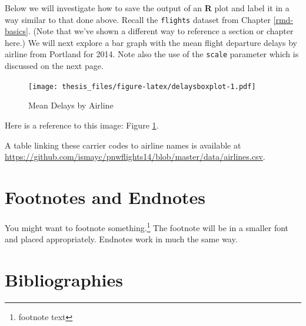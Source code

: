 \documentclass[ms]{uncgdissertationexp}
\newenvironment{Shaded}{\begin{snugshade}}{\end{snugshade}}
\newcommand{\KeywordTok}[1]{\textcolor[rgb]{0.13,0.29,0.53}{\textbf{#1}}}
\newcommand{\DataTypeTok}[1]{\textcolor[rgb]{0.13,0.29,0.53}{#1}}
\newcommand{\StringTok}[1]{\textcolor[rgb]{0.31,0.60,0.02}{#1}}
\newcommand{\OperatorTok}[1]{\textcolor[rgb]{0.81,0.36,0.00}{\textbf{#1}}}
\newcommand{\NormalTok}[1]{#1}
\theoremstyle{plain}
\theoremstyle{definition}
\theoremstyle{remark}
\begin{document}
  Below we will investigate how to save the output of an \textbf{R} plot
  and label it in a way similar to that done above. Recall the
  \texttt{flights} dataset from Chapter \ref{rmd-basics}. (Note that we've
  shown a different way to reference a section or chapter here.) We will
  next explore a bar graph with the mean flight departure delays by
  airline from Portland for 2014. Note also the use of the \texttt{scale}
  parameter which is discussed on the next page.
  \begin{Shaded}
  \end{Shaded}
  \begin{figure}
  \centering
  \texttt{[image: thesis\_files/figure-latex/delaysboxplot-1.pdf]}
  \caption{\label{fig:delaysboxplot}Mean Delays by Airline}
  \end{figure}
  Here is a reference to this image: Figure \ref{fig:delaysboxplot}.
  
  A table linking these carrier codes to airline names is available at
  \url{https://github.com/ismayc/pnwflights14/blob/master/data/airlines.csv}.
  
  \clearpage
  
  \section{Footnotes and Endnotes}\label{footnotes-and-endnotes}
  
  You might want to footnote something.\footnote{footnote text} The
  footnote will be in a smaller font and placed appropriately. Endnotes
  work in much the same way.
  
  \section{Bibliographies}\label{bibliographies}
  
\end{document}
